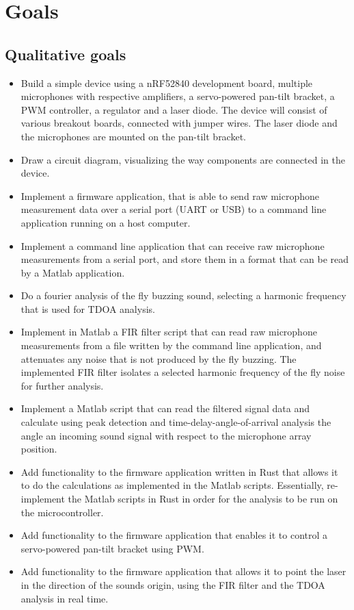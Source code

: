 \documentclass[a4paper]{article}
\begin{document}
\section{Goals}

\subsection{Qualitative goals}
\begin{itemize}
    \item Build a simple device using a nRF52840 development board, multiple microphones with respective amplifiers, a servo-powered pan-tilt bracket, a PWM controller, a regulator and a laser diode. The device will consist of various breakout boards, connected with jumper wires. The laser diode and the microphones are mounted on the pan-tilt bracket.
    \item Draw a circuit diagram, visualizing the way components are connected in the device.
    \item Implement a firmware application, that is able to send raw microphone measurement data over a serial port (UART \cite{uart} or USB) to a command line application running on a host computer.
    \item Implement a command line application that can receive raw microphone measurements from a serial port, and store them in a format that can be read by a Matlab application.
    \item Do a fourier analysis of the fly buzzing sound, selecting a harmonic frequency that is used for TDOA analysis.
    \item Implement in Matlab a FIR filter script that can read raw microphone measurements from a file written by the command line application, and attenuates any noise that is not produced by the fly buzzing. The implemented FIR filter isolates a selected harmonic frequency of the fly noise for further analysis.
    \item Implement a Matlab script that can read the filtered signal data and calculate using peak detection and time-delay-angle-of-arrival analysis the angle an incoming sound signal with respect to the microphone array position.
    \item Add functionality to the firmware application written in Rust that allows it to do the calculations as implemented in the Matlab scripts. Essentially, re-implement the Matlab scripts in Rust in order for the analysis to be run on the microcontroller.
    \item Add functionality to the firmware application that enables it to control a servo-powered pan-tilt bracket using PWM.
    \item Add functionality to the firmware application that allows it to point the laser in the direction of the sounds origin, using the FIR filter and the TDOA analysis in real time.
\end{itemize} 
\end{document}
